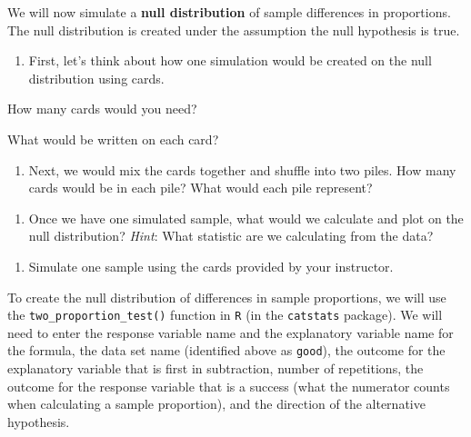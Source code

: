\documentclass[
]{report}
\providecommand{\tightlist}{%
  \setlength{\itemsep}{0pt}\setlength{\parskip}{0pt}}
\newcommand{\rgi}{\hspace{24pt}}  %
\begin{document}
\newpage

We will now simulate a \textbf{null distribution} of sample differences in proportions. The null distribution is created under the assumption the null hypothesis is true.

\begin{enumerate}
\def\labelenumi{\arabic{enumi}.}
\setcounter{enumi}{11}
\tightlist
\item
  First, let's think about how one simulation would be created on the null distribution using cards.
\end{enumerate}

\rgi How many cards would you need?
\vspace{0.1in}

\rgi What would be written on each card?

\vspace{0.5in}

\begin{enumerate}
\def\labelenumi{\arabic{enumi}.}
\setcounter{enumi}{12}
\tightlist
\item
  Next, we would mix the cards together and shuffle into two piles. How many cards would be in each pile? What would each pile represent?
\end{enumerate}

\vspace{0.8in}

\begin{enumerate}
\def\labelenumi{\arabic{enumi}.}
\setcounter{enumi}{13}
\tightlist
\item
  Once we have one simulated sample, what would we calculate and plot on the null distribution? \emph{Hint}: What statistic are we calculating from the data?
\end{enumerate}

\vspace{0.8in}

\begin{enumerate}
\def\labelenumi{\arabic{enumi}.}
\setcounter{enumi}{14}
\tightlist
\item
  Simulate one sample using the cards provided by your instructor.
\end{enumerate}

\vspace{1in}

To create the null distribution of differences in sample proportions, we will use the \texttt{two\_proportion\_test()} function in \texttt{R} (in the \texttt{catstats} package). We will need to enter the response variable name and the explanatory variable name for the formula, the data set name (identified above as \texttt{good}), the outcome for the explanatory variable that is first in subtraction, number of repetitions, the outcome for the response variable that is a success (what the numerator counts when calculating a sample proportion), and the direction of the alternative hypothesis.
\end{document}
